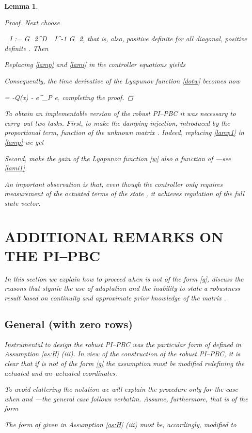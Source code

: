 \documentclass[10pt, conference]{ieeeconf}
\newtheorem{lemma}{Lemma}
\def\begequ{}
\def\lab{\label}
\begin{document}
\begin{lemma}
\begin{proof}
Next choose
\begequ
\lab{lami1}
\Lambda_I := G_2^\top D \Gamma_I^{-1} G_2,
\endequ
that is, also, positive definite for all diagonal, positive definite . Then

Replacing \eqref{lamp} and \eqref{lami} in the controller equations yields

Consequently, the time derivative of the Lyapunov function \eqref{dotw} becomes now
\begequ
\lab{dotw1}
	 = -Q(x) - e^\top \Lambda_P e,
\endequ
completing the proof.
\end{proof}

To obtain an implementable version of the robust PI--PBC it was necessary to carry--out two tasks. First, to make the damping injection, introduced by the proportional term, function of the unknown matrix . Indeed, replacing \eqref{lamp1} in \eqref{lamp} we get

Second, make the gain  of the Lyapunov function \eqref{w} also a function of ---see \eqref{lami1}. 

An important observation is that, even though the controller only requires measurement of the actuated terms of the state ,  it achieves regulation of the full state vector.
\section{ADDITIONAL REMARKS ON THE PI--PBC}
\lab{sec5}	
In this section we explain how to proceed when  is not of the form \eqref{g}, discuss the reasons that stymie the use of adaptation and the inability to state a robustness result based on continuity and approximate prior knowledge of the matrix .
\subsection{General  (with  zero rows)}
\lab{subsec51}	


Instrumental to design the robust PI--PBC was the particular form of  defined in Assumption \ref{as:H} (iii). In view of the construction of the robust PI--PBC, it is clear that if  is not of the form  \eqref{g} the assumption must be modified redefining the actuated and un--actuated coordinates. 

To avoid cluttering the notation we will explain the procedure only for the case when  and ---the general case follows {\em verbatim}. Assume, furthermore, that  is of the form

The form of  given in Assumption \ref{as:H} (iii) must be, accordingly, modified to


\end{lemma}
\end{document}
